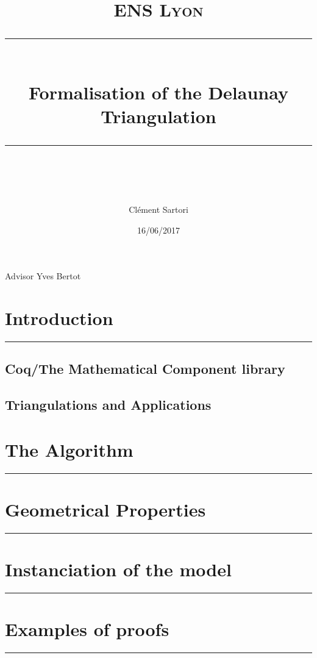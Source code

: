 \message{ !name(Report.tex)}\documentclass[a4paper,10pt]{article}
\title{
\normalfont \normalsize 
\textsc{ENS Lyon} \\
[10pt] 
\rule{\linewidth}{0.5pt} \\[6pt] 
\huge Formalisation of the Delaunay Triangulation \\
\rule{\linewidth}{2pt}  \\[10pt]
}
\author{Clément Sartori}
\date{\normalsize 16/06/2017}
\begin{document}


\maketitle
\noindent
Advisor \dotfill Yves Bertot \\


\maketitle

\begin{abstract}
  
\end{abstract}

\section{Introduction}
\rule{\linewidth}{0.5pt}
\subsection{Coq/The Mathematical Component library}

\subsection{Triangulations and Applications}

\section{The Algorithm}
\rule{\linewidth}{0.5pt}

\section{Geometrical Properties}
\rule{\linewidth}{0.5pt}

\section{Instanciation of the model}
\rule{\linewidth}{0.5pt}


\section{Examples of proofs}
\rule{\linewidth}{0.5pt}
\end{document}
